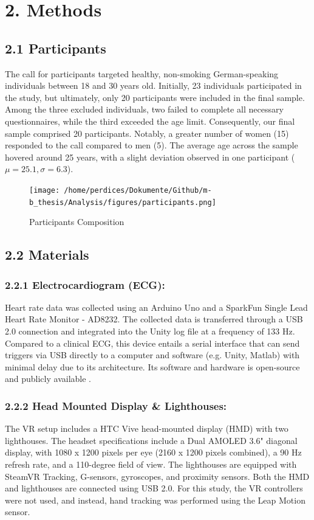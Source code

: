 \documentclass[12pt,oneside,openright]{report}
\begin{document}

\section*{2. Methods}
\subsection*{2.1 Participants}
The call for participants targeted healthy, non-smoking German-speaking individuals between 18 and 30 years old. Initially, 23 individuals participated in the study, but ultimately, only 20 participants were included in the final sample. Among the three excluded individuals, two failed to complete all necessary questionnaires, while the third exceeded the age limit. Consequently, our final sample comprised 20 participants. Notably, a greater number of women (15) responded to the call compared to men (5). The average age across the sample hovered around 25 years, with a slight deviation observed in one participant ($\mu=25.1, \sigma=6.3$).

\begin{figure}[h]
    \centering
    \texttt{[image: /home/perdices/Dokumente/Github/m-b\_thesis/Analysis/figures/participants.png]}
    \caption{Participants Composition}
    \label{fig:mesh1}
\end{figure}

    
\subsection*{2.2 Materials}
\subsubsection*{2.2.1 Electrocardiogram (ECG):}
Heart rate data was collected using an Arduino Uno and a SparkFun Single Lead Heart Rate Monitor - AD8232. The collected data is transferred through a USB 2.0 connection and integrated into the Unity log file at a frequency of 133 Hz. Compared to a clinical ECG, this device entails a serial interface that can send triggers via USB directly to a computer and software (e.g. Unity, Matlab) with minimal delay due to its architecture. Its software and hardware is open-source and publicly available \parencite{TimsECG}.

\subsubsection*{2.2.2 Head Mounted Display \& Lighthouses:}
The VR setup includes a HTC Vive head-mounted display (HMD) with two lighthouses. The headset specifications include a Dual AMOLED 3.6" diagonal display, with 1080 x 1200 pixels per eye (2160 x 1200 pixels combined), a 90 Hz refresh rate, and a 110-degree field of view. The lighthouses are equipped with SteamVR Tracking, G-sensors, gyroscopes, and proximity sensors. Both the HMD and lighthouses are connected using USB 2.0. For this study, the VR controllers were not used, and instead, hand tracking was performed using the Leap Motion sensor.
\end{document}
